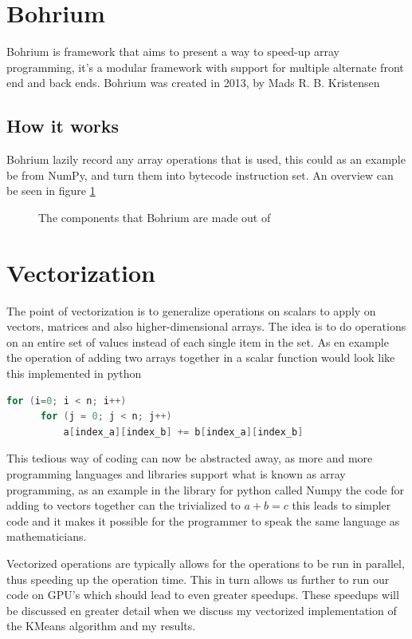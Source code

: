 \documentclass[12pt]{report}
\begin{document}
\section{Bohrium}
\label{subsec:Bohrium}
Bohrium is framework that aims to present a way to speed-up array programming, it's a modular framework with support for multiple alternate front end and back ends. Bohrium was created in 2013, by Mads R. B. Kristensen

\subsection{How it works}
\label{subsec:hiw}
Bohrium lazily record any array operations that is used, this could as an example be from NumPy, and turn them into bytecode instruction set. An overview can be seen in figure \ref{fig:bohrium}

\begin{figure}[H]
  \centering
  \label{fig:bohrium}
  
\caption{The components that Bohrium are made out of}
\end{figure}



\section{Vectorization}
\label{subsec:vectorization}

The point of vectorization is to generalize operations on scalars to apply on vectors, matrices and also higher-dimensional arrays. The idea is to do operations on an entire set of values instead of each single item in the set. As en example the operation of adding two arrays together in a scalar function would look like this implemented in python
\begin{lstlisting}[language=C]
  for (i=0; i < n; i++)
      for (j = 0; j < n; j++)
          a[index_a][index_b] += b[index_a][index_b]
\end{lstlisting}

This tedious way of coding can now be abstracted away, as more and more programming languages and libraries support what is known as array programming, as an example in the library for python called Numpy the code for adding to vectors together can the trivialized to $a + b = c$ this leads to simpler code and it makes it possible for the programmer to speak the same language as mathematicians.

Vectorized operations are typically allows for the operations to be run in parallel, thus speeding up the operation time. This in turn allows us further to run our code on GPU's which should lead to even greater speedups. These speedups will be discussed en greater detail when we discuss my vectorized implementation of the KMeans algorithm and my results.
\end{document}
